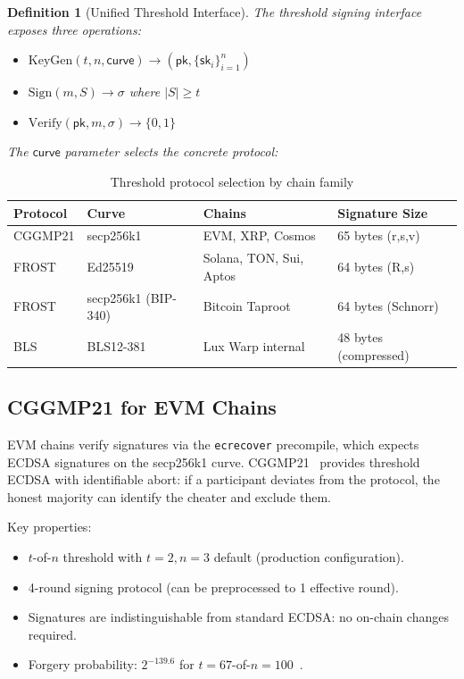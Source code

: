 \documentclass[11pt]{article}
\newtheorem{definition}{Definition}
\begin{document}
\begin{definition}[Unified Threshold Interface]
\label{def:threshold-iface}
The threshold signing interface exposes three operations:
\begin{itemize}[nosep]
  \item $\mathrm{KeyGen}(t, n, \mathsf{curve}) \to (\mathsf{pk}, \{\mathsf{sk}_i\}_{i=1}^{n})$
  \item $\mathrm{Sign}(m, S) \to \sigma$ where $|S| \geq t$
  \item $\mathrm{Verify}(\mathsf{pk}, m, \sigma) \to \{0, 1\}$
\end{itemize}
The $\mathsf{curve}$ parameter selects the concrete protocol:
\end{definition}

\begin{table}[H]
\centering
\begin{tabular}{llll}
\toprule
\textbf{Protocol} & \textbf{Curve} & \textbf{Chains} & \textbf{Signature Size} \\
\midrule
CGGMP21 & secp256k1 & EVM, XRP, Cosmos & 65 bytes (r,s,v) \\
FROST   & Ed25519   & Solana, TON, Sui, Aptos & 64 bytes (R,s) \\
FROST   & secp256k1 (BIP-340) & Bitcoin Taproot & 64 bytes (Schnorr) \\
BLS     & BLS12-381 & Lux Warp internal & 48 bytes (compressed) \\
\bottomrule
\end{tabular}
\caption{Threshold protocol selection by chain family}
\label{tab:protocols}
\end{table}

\subsection{CGGMP21 for EVM Chains}

EVM chains verify signatures via the \texttt{ecrecover} precompile, which expects ECDSA signatures on the secp256k1 curve. CGGMP21~\cite{cggmp21} provides threshold ECDSA with identifiable abort: if a participant deviates from the protocol, the honest majority can identify the cheater and exclude them.

Key properties:
\begin{itemize}[nosep]
  \item $t$-of-$n$ threshold with $t = 2, n = 3$ default (production configuration).
  \item 4-round signing protocol (can be preprocessed to 1 effective round).
  \item Signatures are indistinguishable from standard ECDSA: no on-chain changes required.
  \item Forgery probability: $2^{-139.6}$ for $t = 67$-of-$n = 100$~\cite{luxbridge2023}.
\end{itemize}
\end{document}

